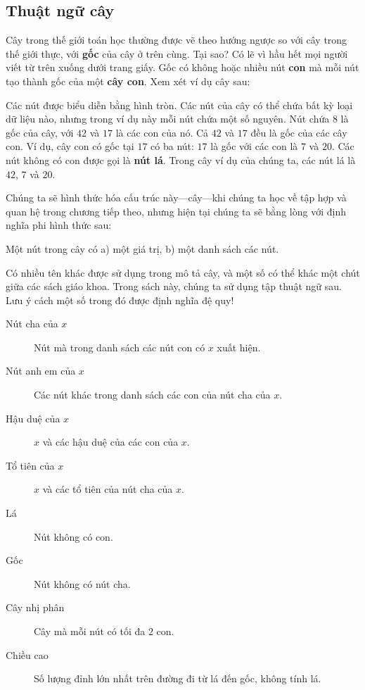 \subsection{Thuật ngữ cây}

Cây trong thế giới toán học thường được vẽ theo hướng ngược so với cây trong thế giới thực, với \textbf{gốc} của cây ở trên cùng. Tại sao? Có lẽ vì hầu hết mọi người viết từ trên xuống dưới trang giấy. Gốc có không hoặc nhiều nút \textbf{con} mà mỗi nút tạo thành gốc của một \textbf{cây con}. Xem xét ví dụ cây sau:

\begin{center}
\end{center}

Các nút được biểu diễn bằng hình tròn. Các nút của cây có thể chứa bất kỳ loại dữ liệu nào, nhưng trong ví dụ này mỗi nút chứa một số nguyên. Nút chứa $8$ là gốc của cây, với $42$ và $17$ là các con của nó. Cả $42$ và $17$ đều là gốc của các cây con. Ví dụ, cây con có gốc tại $17$ có ba nút: $17$ là gốc với các con là $7$ và $20$. Các nút không có con được gọi là \textbf{nút lá}. Trong cây ví dụ của chúng ta, các nút lá là $42$, $7$ và $20$.

Chúng ta sẽ hình thức hóa cấu trúc này---cây---khi chúng ta học về tập hợp và quan hệ trong chương tiếp theo, nhưng hiện tại chúng ta sẽ bằng lòng với định nghĩa phi hình thức sau:

\begin{definition}
Một nút trong cây có a) một giá trị, b) một danh sách các nút.
\end{definition}

Có nhiều tên khác được sử dụng trong mô tả cây, và một số có thể khác một chút giữa các sách giáo khoa. Trong sách này, chúng ta sử dụng tập thuật ngữ sau. Lưu ý cách một số trong đó được định nghĩa đệ quy!

\begin{description}
\item[Nút cha của $x$] Nút mà trong danh sách các nút con có $x$ xuất hiện.
\item[Nút anh em của $x$] Các nút khác trong danh sách các con của nút cha của $x$.
\item[Hậu duệ của $x$] $x$ và các hậu duệ của các con của $x$.
\item[Tổ tiên của $x$] $x$ và các tổ tiên của nút cha của $x$.
\item[Lá] Nút không có con.
\item[Gốc] Nút không có nút cha.
\item[Cây nhị phân] Cây mà mỗi nút có tối đa $2$ con.
\item[Chiều cao] Số lượng đỉnh lớn nhất trên đường đi từ lá đến gốc, không tính lá.
\end{description}

